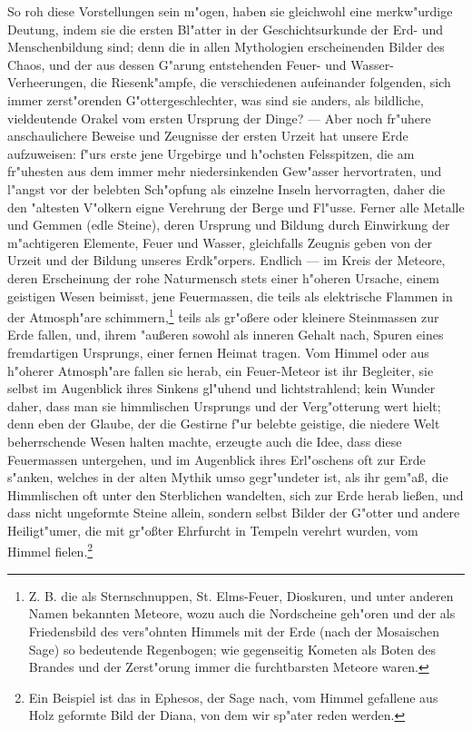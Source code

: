 \documentclass[a4paper, 11pt, oneside, polutonikogreek, german]{article}
\begin{document}
So roh diese Vorstellungen sein m"ogen, haben sie gleichwohl eine merkw"urdige Deutung, indem sie die ersten Bl"atter in der Geschichtsurkunde der Erd- und Menschenbildung sind; denn die in allen Mythologien erscheinenden Bilder des Chaos, und der aus dessen G"arung entstehenden Feuer- und Wasser-Verheerungen, die Riesenk"ampfe, die verschiedenen aufeinander folgenden, sich immer zerst"orenden G"ottergeschlechter, was sind sie anders, als bildliche, vieldeutende Orakel vom ersten Ursprung der Dinge? --- Aber noch fr"uhere anschaulichere Beweise und Zeugnisse der ersten Urzeit hat unsere Erde aufzuweisen: f"urs erste jene Urgebirge und h"ochsten Felsspitzen, die am fr"uhesten aus dem immer mehr niedersinkenden Gew"asser hervortraten, und l"angst vor der belebten Sch"opfung als einzelne Inseln hervorragten, daher die den "altesten V"olkern eigne Verehrung der Berge und Fl"usse. Ferner alle Metalle und Gemmen (edle Steine), deren Ursprung und Bildung durch Einwirkung der m"achtigeren Elemente, Feuer und Wasser, gleichfalls Zeugnis geben von der Urzeit und der Bildung unseres Erdk"orpers. Endlich --- im Kreis der Meteore, deren Erscheinung der rohe Naturmensch stets einer h"oheren Ursache, einem geistigen Wesen beimisst, jene Feuermassen, die teils als elektrische Flammen in der Atmosph"are schimmern,\footnote{Z. B. die als Sternschnuppen, St. Elms-Feuer, Dioskuren, und unter anderen Namen bekannten Meteore, wozu auch die Nordscheine geh"oren und der als Friedensbild des vers"ohnten Himmels mit der Erde (nach der Mosaischen Sage) so bedeutende Regenbogen; wie gegenseitig Kometen als Boten des Brandes und der Zerst"orung immer die furchtbarsten Meteore waren.} teils als gr"oßere oder kleinere Steinmassen zur Erde fallen, und, ihrem "außeren sowohl als inneren Gehalt nach, Spuren eines fremdartigen Ursprungs, einer fernen Heimat tragen. Vom Himmel oder aus h"oherer Atmosph"are fallen sie herab, ein Feuer-Meteor ist ihr Begleiter, sie selbst im Augenblick ihres Sinkens gl"uhend und lichtstrahlend; kein Wunder daher, dass man sie himmlischen Ursprungs und der Verg"otterung wert hielt; denn eben der Glaube, der die Gestirne f"ur belebte geistige, die niedere Welt beherrschende Wesen halten machte, erzeugte auch die Idee, dass diese Feuermassen untergehen, und im Augenblick ihres Erl"oschens oft zur Erde s"anken, welches in der alten Mythik umso gegr"undeter ist, als ihr gem"aß, die Himmlischen oft unter den Sterblichen wandelten, sich zur Erde herab ließen, und dass nicht ungeformte Steine allein, sondern selbst Bilder der G"otter und andere Heiligt"umer, die mit gr"oßter Ehrfurcht in Tempeln verehrt wurden, vom Himmel fielen.\footnote{Ein Beispiel ist das in Ephesos, der Sage nach, vom Himmel gefallene aus Holz geformte Bild der Diana, von dem wir sp"ater reden werden.}
\end{document}
